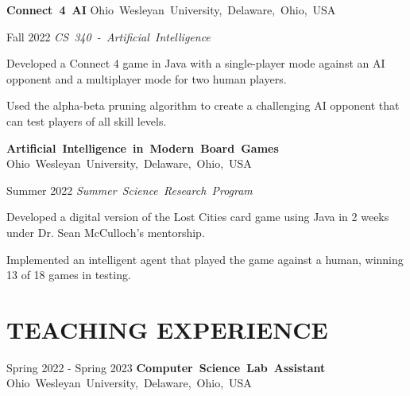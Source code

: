 \documentclass[10pt, letterpaper]{article}
\begin{document}
\vspace{\entrySpacing}
\mbox{\textbf{Connect 4 AI}}
\kern {}
\AND
\kern {}
\mbox{Ohio Wesleyan University, Delaware, Ohio, USA}

\vspace{\highlightSpacing}
\begin{twocolentry}{Fall 2022}
    \mbox{\textit{CS 340 - Artificial Intelligence}}
\end{twocolentry}

\begin{onecolentry}
    \begin{highlights}
        \item Developed a Connect 4 game in Java with a single-player mode against an AI opponent and a multiplayer mode for two human players.
        \item Used the alpha-beta pruning algorithm to create a challenging AI opponent that can test players of all skill levels.
    \end{highlights}
\end{onecolentry}

\vspace{\entrySpacing}
\mbox{\textbf{Artificial Intelligence in Modern Board Games}}
\kern {}
\AND
\kern {}
\mbox{Ohio Wesleyan University, Delaware, Ohio, USA}

\vspace{\highlightSpacing}
\begin{twocolentry}{Summer 2022}
    \mbox{\textit{Summer Science Research Program}}
\end{twocolentry}

\begin{onecolentry}
    \begin{highlights}
        \item Developed a digital version of the Lost Cities card game using Java in 2 weeks under Dr. Sean McCulloch's mentorship.
        \item Implemented an intelligent agent that played the game against a human, winning 13 of 18 games in testing.

    \end{highlights}
\end{onecolentry}

\section{TEACHING EXPERIENCE}

\begin{twocolentry}{Spring 2022 - Spring 2023}
    \mbox{\textbf{Computer Science Lab Assistant}}
    \kern {}
    \AND
    \kern {}
    \mbox{Ohio Wesleyan University, Delaware, Ohio, USA}
\end{twocolentry}
\end{document}
